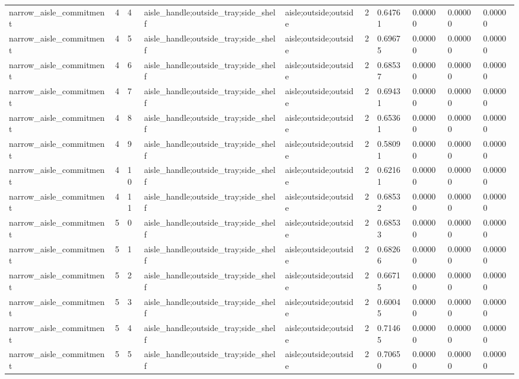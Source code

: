\documentclass{article}
\begin{document}
\begin{table}[tbp]
{\begin{tabular}{llllllllll}
narrow\_aisle\_commitment & 4 & 4 & aisle\_handle;outside\_tray;side\_shelf & aisle;outside;outside & 2 & 0.64761 & 0.00000 & 0.00000 & 0.00000 \\
narrow\_aisle\_commitment & 4 & 5 & aisle\_handle;outside\_tray;side\_shelf & aisle;outside;outside & 2 & 0.69675 & 0.00000 & 0.00000 & 0.00000 \\
narrow\_aisle\_commitment & 4 & 6 & aisle\_handle;outside\_tray;side\_shelf & aisle;outside;outside & 2 & 0.68537 & 0.00000 & 0.00000 & 0.00000 \\
narrow\_aisle\_commitment & 4 & 7 & aisle\_handle;outside\_tray;side\_shelf & aisle;outside;outside & 2 & 0.69431 & 0.00000 & 0.00000 & 0.00000 \\
narrow\_aisle\_commitment & 4 & 8 & aisle\_handle;outside\_tray;side\_shelf & aisle;outside;outside & 2 & 0.65361 & 0.00000 & 0.00000 & 0.00000 \\
narrow\_aisle\_commitment & 4 & 9 & aisle\_handle;outside\_tray;side\_shelf & aisle;outside;outside & 2 & 0.58091 & 0.00000 & 0.00000 & 0.00000 \\
narrow\_aisle\_commitment & 4 & 10 & aisle\_handle;outside\_tray;side\_shelf & aisle;outside;outside & 2 & 0.62161 & 0.00000 & 0.00000 & 0.00000 \\
narrow\_aisle\_commitment & 4 & 11 & aisle\_handle;outside\_tray;side\_shelf & aisle;outside;outside & 2 & 0.68532 & 0.00000 & 0.00000 & 0.00000 \\
narrow\_aisle\_commitment & 5 & 0 & aisle\_handle;outside\_tray;side\_shelf & aisle;outside;outside & 2 & 0.68533 & 0.00000 & 0.00000 & 0.00000 \\
narrow\_aisle\_commitment & 5 & 1 & aisle\_handle;outside\_tray;side\_shelf & aisle;outside;outside & 2 & 0.68266 & 0.00000 & 0.00000 & 0.00000 \\
narrow\_aisle\_commitment & 5 & 2 & aisle\_handle;outside\_tray;side\_shelf & aisle;outside;outside & 2 & 0.66715 & 0.00000 & 0.00000 & 0.00000 \\
narrow\_aisle\_commitment & 5 & 3 & aisle\_handle;outside\_tray;side\_shelf & aisle;outside;outside & 2 & 0.60045 & 0.00000 & 0.00000 & 0.00000 \\
narrow\_aisle\_commitment & 5 & 4 & aisle\_handle;outside\_tray;side\_shelf & aisle;outside;outside & 2 & 0.71465 & 0.00000 & 0.00000 & 0.00000 \\
narrow\_aisle\_commitment & 5 & 5 & aisle\_handle;outside\_tray;side\_shelf & aisle;outside;outside & 2 & 0.70650 & 0.00000 & 0.00000 & 0.00000 \\

\end{tabular}}
\end{table}
\end{document}
